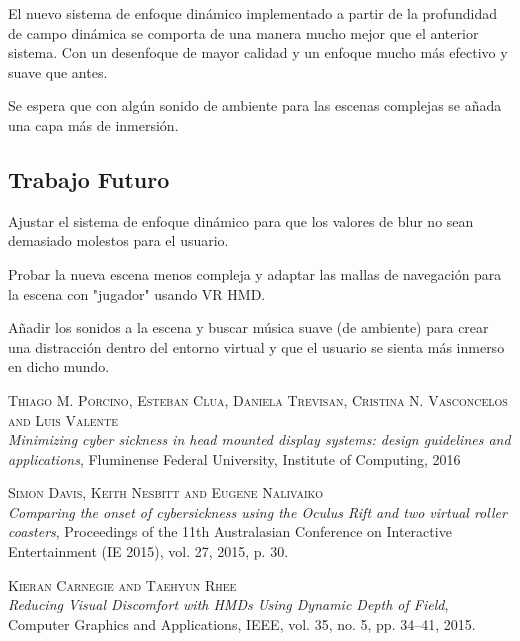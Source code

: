 \documentclass[12pt,a4paper]{article}
\begin{document}
El nuevo sistema de enfoque dinámico implementado a partir de la profundidad de campo dinámica se comporta de una manera mucho mejor que el anterior sistema. Con un desenfoque de mayor calidad y un enfoque mucho más efectivo y suave que antes.

Se espera que con algún sonido de ambiente para las escenas complejas se añada una capa más de inmersión.

\subsection{Trabajo Futuro}

Ajustar el sistema de enfoque dinámico para que los valores de blur no sean demasiado molestos para el usuario.

Probar la nueva escena menos compleja y adaptar las mallas de navegación para la escena con "jugador" usando VR HMD.

Añadir los sonidos a la escena y buscar música suave (de ambiente) para crear una distracción dentro del entorno virtual y que el usuario se sienta más inmerso en dicho mundo.

\break

\begin{thebibliography}{X}

\textsc{Thiago M. Porcino, Esteban Clua, Daniela Trevisan, Cristina N. Vasconcelos and Luis Valente}\\
\textit{Minimizing cyber sickness in head mounted display systems: design guidelines and applications}, Fluminense Federal University, Institute of Computing, 2016

\textsc{Simon Davis, Keith Nesbitt and Eugene Nalivaiko}\\
\textit{Comparing the onset of cybersickness using the Oculus Rift and two virtual roller coasters}, Proceedings of the 11th Australasian Conference on Interactive Entertainment (IE 2015), vol. 27, 2015, p. 30.

\textsc{Kieran Carnegie and Taehyun Rhee}\\
\textit{Reducing Visual Discomfort with HMDs Using Dynamic Depth of Field}, Computer Graphics and Applications, IEEE, vol. 35, no. 5, pp. 34–41, 2015.

\end{thebibliography}
\end{document}
